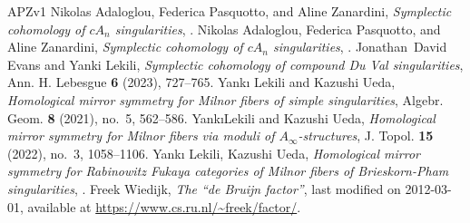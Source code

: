 \begin{thebibliography}{APZv1}
Nikolas Adaloglou, Federica Pasquotto, and Aline Zanardini,
\emph{Symplectic cohomology of {$cA_n$} singularities},
.
Nikolas Adaloglou, Federica Pasquotto, and Aline Zanardini,
\emph{Symplectic cohomology of {$cA_n$} singularities},
.
Jonathan~David Evans and Yanki Lekili,
\emph{Symplectic cohomology of compound {D}u {V}al singularities},
Ann. H. Lebesgue \textbf{6} (2023), 727--765. 
Yank{\i} Lekili and Kazushi Ueda, \emph{Homological mirror symmetry for {M}ilnor fibers of simple singularities}, Algebr. Geom. \textbf{8} (2021), no.~5, 562--586. 
Yank\i Lekili and Kazushi Ueda, \emph{Homological mirror symmetry for {M}ilnor fibers via moduli of {$A_\infty$}-structures}, J. Topol. \textbf{15} (2022), no.~3, 1058--1106. 
Yank{\i} Lekili, Kazushi Ueda,
\emph{Homological mirror symmetry for Rabinowitz Fukaya categories
of Milnor fibers of Brieskorn-Pham singularities},
.
Freek Wiedijk,
\emph{The ``de {Bruijn} factor''},
last modified on 2012-03-01,
available at \url{https://www.cs.ru.nl/~freek/factor/}.
\end{thebibliography}
